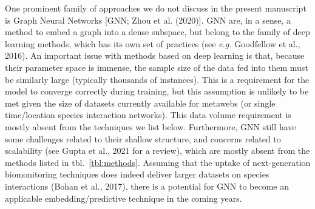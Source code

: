 \documentclass[10pt,oneside]{article}
\begin{document}
One prominent family of approaches we do not discuss in the present
manuscript is Graph Neural Networks {[}GNN; Zhou et al. (2020){]}. GNN
are, in a sense, a method to embed a graph into a dense subspace, but
belong to the family of deep learning methods, which has its own set of
practices (see \emph{e.g.} Goodfellow et al., 2016). An important issue
with methods based on deep learning is that, because their parameter
space is immense, the sample size of the data fed into them must be
similarly large (typically thousands of instances). This is a
requirement for the model to converge correctly during training, but
this assumption is unlikely to be met given the size of datasets
currently available for metawebs (or single time/location species
interaction networks). This data volume requirement is mostly absent
from the techniques we list below. Furthermore, GNN still have some
challenges related to their shallow structure, and concerns related to
scalability (see Gupta et al., 2021 for a review), which are mostly
absent from the methods listed in tbl.~\ref{tbl:methods}. Assuming that
the uptake of next-generation biomonitoring techniques does indeed
deliver larger datasets on species interactions (Bohan et al., 2017),
there is a potential for GNN to become an applicable
embedding/predictive technique in the coming years.
\end{document}
